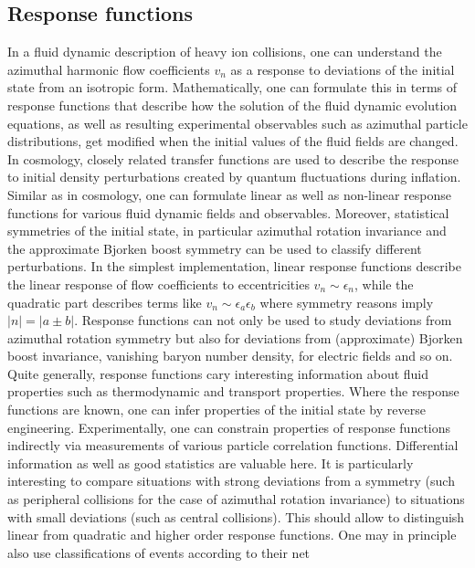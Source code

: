 \subsection{Response functions}
In a fluid dynamic description of heavy ion collisions,  one can understand 
  the azimuthal harmonic flow coefficients $v_n$ as a response to deviations 
  of the initial state from an isotropic form. 
Mathematically,  one can formulate this in terms of response functions that 
  describe how the solution of the fluid dynamic evolution equations,  
  as well as resulting experimental observables such as azimuthal particle 
  distributions,  get modified when the initial values of the fluid fields 
  are changed. 
In cosmology,  closely related transfer functions are used to describe the 
  response to initial density perturbations created by quantum fluctuations 
  during inflation. Similar as in cosmology,  one can formulate linear as 
  well as non-linear response functions for various fluid dynamic fields 
  and observables. 
Moreover,  statistical symmetries of the initial state,  in particular 
  azimuthal rotation invariance and the approximate Bjorken boost symmetry 
  can be used to classify different perturbations. 
In the simplest implementation,  linear response functions describe the 
  linear response of flow coefficients to eccentricities $v_n \sim\epsilon_n$,  
  while the quadratic part describes terms like $v_n \sim \epsilon_a\epsilon_b$ 
  where symmetry reasons imply $|n|=|a\pm b|$. Response functions can not only be 
  used to study deviations from azimuthal rotation symmetry but also for deviations 
  from (approximate) Bjorken boost invariance,  vanishing baryon number density,  
  for electric fields and so on. 
Quite generally,  response functions cary interesting information about fluid 
  properties such as thermodynamic and transport properties. 
  Where the response functions are known,  one can infer properties of the 
  initial state by reverse engineering.
Experimentally,  one can constrain properties of response functions indirectly 
  via measurements of various particle correlation functions. 
Differential information as well as good statistics are valuable here. 
  It is particularly interesting to compare situations with strong deviations 
  from a symmetry (such as peripheral collisions for the case of azimuthal 
  rotation invariance) to situations with small deviations (such as central collisions). 
This should allow to distinguish linear from quadratic and higher order response functions.
One may in principle also use classifications of events according to their net 
